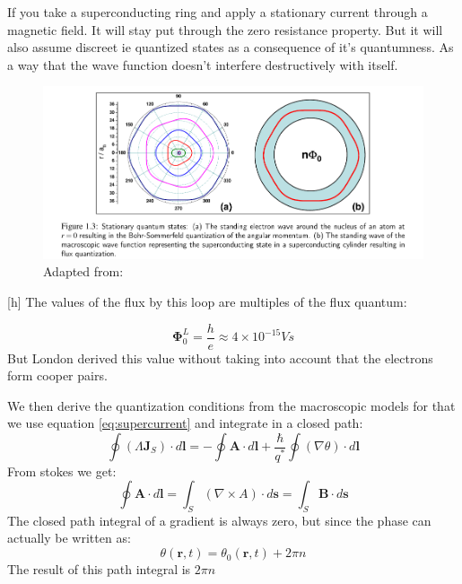 \documentclass[12pt]{article}
\numberwithin{equation}{subsection}
\newcommand\ask[1]{
{%
}
}
\newcommand\page[1]{
{
}
}
\begin{document}
If you take a superconducting ring and apply a stationary current through a magnetic field. It will stay put through the zero resistance property. But it will also assume discreet ie quantized states as a consequence of it's quantumness. As a way that the wave function doesn't interfere destructively with itself. 
\begin{figure}[h]
\includegraphics[scale=1.6]{images/flux-quantization.png}
\caption{Adapted from: \cite{gross2016applied}}
\end{figure}[h]
The values of the flux by this loop are multiples of the flux quantum:

\begin{equation}
    \mathbf{\Phi}^L_0 = \frac{h}{e} \approx 4\times 10^{-15} Vs
\end{equation}
But London derived this value without taking into account that the electrons form cooper pairs.
\page{25}
We then derive the quantization conditions from the macroscopic models for that we use equation \ref{eq:supercurrent} and integrate in a closed path:
\begin{equation}
    \oint (\Lambda \mathbf{J}_S) \cdot d\mathbf{l}  = -\oint \mathbf{A} \cdot d\mathbf{l} +\frac{\hbar}{q^*}\oint (\nabla \theta) \cdot d\mathbf{l}
    \label{eq:pathint}
\end{equation}
From stokes we get:
\begin{equation}
\oint \mathbf{A} \cdot d\mathbf{l} = \int_S(\nabla \times A)\cdot d\mathbf{s} = \int_S \mathbf{B}\cdot d\mathbf{s}
\end{equation}
The closed path integral of a gradient is always zero, but since the phase can actually be written as:
\begin{equation}
    \theta(\mathbf{r}, t) =     \theta_0(\mathbf{r}, t) +2\pi n
\end{equation}
The result of this path integral is $2\pi n$
\end{document}
